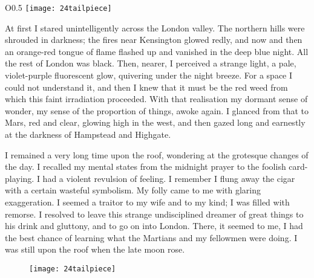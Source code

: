 \makeatletter
{}
{%
	\begin{wrapfigure}{O}{0.5\textwidth}
		\centering
		\texttt{[image: 24tailpiece]}
	\end{wrapfigure}
}{%

}
\makeatother

At first I stared unintelligently across the London valley. The northern hills were shrouded in darkness; the fires near Kensington glowed redly, and now and then an orange-red tongue of flame flashed up and vanished in the deep blue night. All the rest of London was black. Then, nearer, I perceived a strange light, a pale, violet-purple fluorescent glow, quivering under the night breeze. For a space I could not understand it, and then I knew that it must be the red weed from which this faint irradiation proceeded. With that realisation my dormant sense of wonder, my sense of the proportion of things, awoke again. I glanced from that to Mars, red and clear, glowing high in the west, and then gazed long and earnestly at the darkness of Hampstead and Highgate.

I remained a very long time upon the roof, wondering at the grotesque changes of the day. I recalled my mental states from the midnight prayer to the foolish card-playing. I had a violent revulsion of feeling. I remember I flung away the cigar with a certain wasteful symbolism. My folly came to me with glaring exaggeration. I seemed a traitor to my wife and to my kind; I was filled with remorse. I resolved to leave this strange undisciplined dreamer of great things to his drink and gluttony, and to go on into London. There, it seemed to me, I had the best chance of learning what the Martians and my fellowmen were doing. I was still upon the roof when the late moon rose.

\makeatletter
{}
{%
}{%
	\begin{figure}[b!]
		\centering
		\texttt{[image: 24tailpiece]}
	\end{figure}
}
\makeatother

